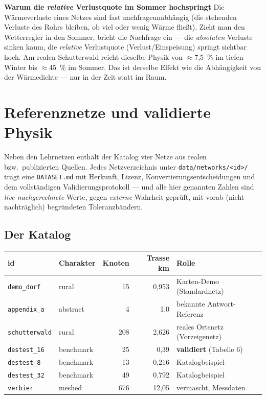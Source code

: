 \documentclass[11pt,a4paper,parskip=half]{scrreprt}
\newcommand{\api}[1]{\texttt{#1}}
\newenvironment{beispiel}[1][Beispiel]
  {\par\medskip{\color{bsp}\hrule height 0.8pt}\nopagebreak\smallskip
   \noindent\textbf{\textsf{\textcolor{bsp}{#1}}}\quad\ignorespaces}
  {\par\nopagebreak\smallskip{\color{bsp}\hrule height 0.8pt}\par\medskip}
\begin{document}
\begin{beispiel}[Warum die \emph{relative} Verlustquote im Sommer hochspringt]
Die Wärmeverluste eines Netzes sind fast nachfrageunabhängig (die stehenden
Verluste des Rohrs bleiben, ob viel oder wenig Wärme fließt). Zieht man den
Wetterregler in den Sommer, bricht die Nachfrage ein --- die \emph{absoluten}
Verluste sinken kaum, die \emph{relative} Verlustquote (Verlust/Einspeisung)
springt sichtbar hoch. Am realen Schutterwald reicht dieselbe Physik von
$\approx$7{,}5~\% im tiefen Winter bis $\approx$45~\% im Sommer. Das ist derselbe
Effekt wie die Abhängigkeit von der Wärmedichte --- nur in der Zeit statt im
Raum.
\end{beispiel}

\chapter{Referenznetze und validierte Physik}
\label{ch:referenznetze}

Neben den Lehrnetzen enthält der Katalog vier Netze aus realen bzw.\
publizierten Quellen. Jedes Netzverzeichnis unter \api{data/networks/<id>/}
trägt eine \texttt{DATASET.md} mit Herkunft, Lizenz,
Konvertierungsentscheidungen und dem vollständigen Validierungsprotokoll ---
und alle hier genannten Zahlen sind \emph{live nachgerechnete} Werte, gegen
\emph{externe} Wahrheit geprüft, mit vorab (nicht nachträglich) begründeten
Toleranzbändern.

\section{Der Katalog}

{\small
\begin{center}
\begin{tabular}{@{}llrrl@{}}
\toprule
id & Charakter & Knoten & Trasse km & Rolle \\
\midrule
\texttt{demo\_dorf}   & rural     & 15  & 0{,}953 & Karten-Demo (Standardnetz) \\
\texttt{appendix\_a}  & abstract  & 4   & 1{,}0   & bekannte Antwort-Referenz \\
\texttt{schutterwald} & rural     & 208 & 2{,}626 & reales Ortsnetz (Vorzeigenetz) \\
\texttt{destest\_16}  & benchmark & 25  & 0{,}39  & \textbf{validiert} (Tabelle 6) \\
\texttt{destest\_8}   & benchmark & 13  & 0{,}216 & Katalogbeispiel \\
\texttt{destest\_32}  & benchmark & 49  & 0{,}792 & Katalogbeispiel \\
\texttt{verbier}      & meshed    & 676 & 12{,}05 & vermascht, Messdaten \\
\bottomrule
\end{tabular}
\end{center}}
\end{document}
